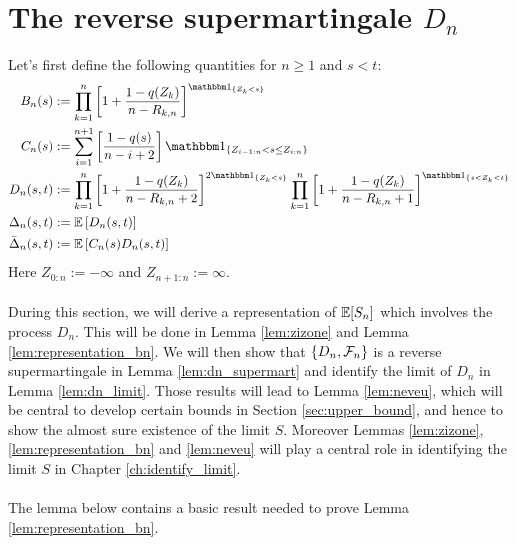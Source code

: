 \section{The reverse supermartingale $D_n$} \label{sec:dn}
Let's first define the following quantities for $n\geq 1$ and $s < t$:
\begin{align*}
B_n(s) &:= \prod_{k=1}^{n}\left[1+\frac{1-q(Z_{k})}{n-R_{k,n}}\right]^{\I{Z_{k} < s}}\\
C_n(s) &:= \sum_{i=1}^{n+1}\left[\frac{1-q(s)}{n-i+2}\right]\I{Z_{i-1:n} < s \leq Z_{i:n}}\\
D_n(s,t) &:= \prod_{k=1}^{n} \left[1+\frac{1-q(Z_k)}{n-R_{k,n} +2}\right]^{2\I{Z_k<s}} \prod_{k=1}^{n}\left[1+\frac{1-q(Z_k)}{n-R_ {k,n}+1}\right]^{\I{s < Z_k < t}}\\
\Delta_n(s,t) &:= \E\left[D_n(s,t) \right]\\
\bar{\Delta}_n(s,t) &:= \E\left[C_n(s)D_n(s,t) \right]
\end{align*}
Here $Z_{0:n} := -\infty$ and $Z_{n+1:n} := \infty$.\\
\\
During this section, we will derive a representation of $\mathbb{E}[S_n]$ which involves the process $D_n$. This will be done in Lemma \ref{lem:zizone} and Lemma \ref{lem:representation_bn}. We will then show that $\{D_n,\mathcal{F}_n\}$ is a reverse supermartingale in Lemma \ref{lem:dn_supermart} and identify the limit of $D_n$ in Lemma \ref{lem:dn_limit}. Those results will lead to Lemma \ref{lem:neveu}, which will be central to develop certain bounds in Section \ref{sec:upper_bound}, and hence to show the almost sure existence of the limit $S$. Moreover Lemmas \ref{lem:zizone}, \ref{lem:representation_bn} and \ref{lem:neveu} will play a central role in identifying the limit $S$ in Chapter \ref{ch:identify_limit}.\\
\\
The lemma below contains a basic result needed to prove Lemma \ref{lem:representation_bn}.
